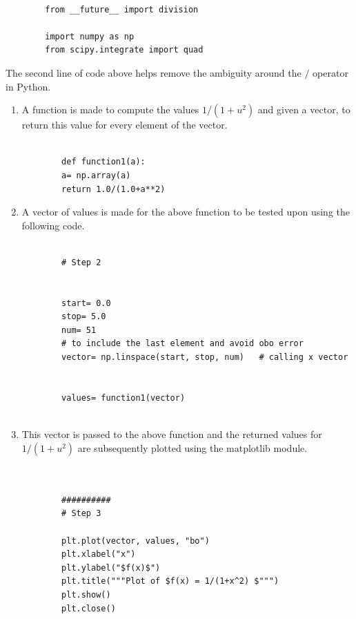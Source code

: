 \documentclass[a4paper, 12pt, margin= 1.25cm ]{article}
\begin{document}
		\begin{lstlisting}
		
		from __future__ import division

		import numpy as np
		from scipy.integrate import quad
		\end{lstlisting}	

	The second line of code above helps remove the ambiguity around the $/$ operator in Python.

	\begin{enumerate}
		\item A function is made to compute the values $1/(1+u^2)$ and given a vector, to return this value for every element of the vector.
		
		\begin{lstlisting}
		
		def function1(a):
		a= np.array(a)
		return 1.0/(1.0+a**2)

		\end{lstlisting}

		\item A vector of values is made for the above function to be tested upon using the following code.

		\begin{lstlisting}
		
		# Step 2


		start= 0.0
		stop= 5.0
		num= 51									
		# to include the last element and avoid obo error
		vector= np.linspace(start, stop, num)	# calling x vector


		values= function1(vector)
				
		\end{lstlisting}		

		\item This vector is passed to the above function and the returned values for $1/(1+u^2)$ are subsequently plotted using the matplotlib module.

		\begin{lstlisting}
		
		
		##########
		# Step 3

		plt.plot(vector, values, "bo")
		plt.xlabel("x")
		plt.ylabel("$f(x)$")
		plt.title("""Plot of $f(x) = 1/(1+x^2) $""")
		plt.show()
		plt.close()

				
		\end{lstlisting}		


\end{enumerate}
\end{document}
